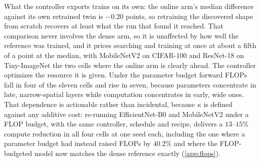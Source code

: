 \documentclass[10pt]{article}
\theoremstyle{paper}
\begin{document}
What the controller exports trains on its own: the online arm's median difference against its own retrained twin is $-0.20$ points, so retraining the discovered shape from scratch recovers at least what the run that found it reached. That comparison never involves the dense arm, so it is unaffected by how well the reference was trained, and it prices searching and training at once at about a fifth of a point at the median, with MobileNetV2 on CIFAR-100 and ResNet-18 on Tiny-ImageNet the two cells where the online arm is clearly ahead. The controller optimizes the resource it is given. Under the parameter budget forward FLOPs fall in four of the eleven cells and rise in seven, because parameters concentrate in late, narrow-spatial layers while computation concentrates in early, wide ones. That dependence is actionable rather than incidental, because $\kappa$ is defined against any additive cost: re-running EfficientNet-B0 and MobileNetV2 under a FLOP budget, with the same controller, schedule and recipe, delivers a $13$--$15\%$ compute reduction in all four cells at one seed each, including the one where a parameter budget had instead raised FLOPs by $40.2\%$ and where the FLOP-budgeted model now matches the dense reference exactly (\cref{app:flops}).
\end{document}
